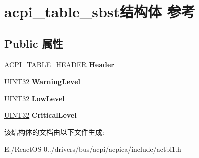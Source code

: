 \hypertarget{structacpi__table__sbst}{}\section{acpi\+\_\+table\+\_\+sbst结构体 参考}
\label{structacpi__table__sbst}
\subsection*{Public 属性}
\begin{DoxyCompactItemize}
\item 
\mbox{\label{structacpi__table__sbst_a5b8a9e8d6767fc12ddb9a6622faebaf8}} 
\hyperlink{structacpi__table__header}{A\+C\+P\+I\+\_\+\+T\+A\+B\+L\+E\+\_\+\+H\+E\+A\+D\+ER} {\bfseries Header}
\item 
\mbox{\label{structacpi__table__sbst_a86ba8882fee0ee899006da5a2548ffba}} 
\hyperlink{_processor_bind_8h_ae1e6edbbc26d6fbc71a90190d0266018}{U\+I\+N\+T32} {\bfseries Warning\+Level}
\item 
\mbox{\label{structacpi__table__sbst_aca6b8b0b2d84737bade5a86af99d3173}} 
\hyperlink{_processor_bind_8h_ae1e6edbbc26d6fbc71a90190d0266018}{U\+I\+N\+T32} {\bfseries Low\+Level}
\item 
\mbox{\label{structacpi__table__sbst_ac80332d1a9a7dcfa588bb426a2f4993e}} 
\hyperlink{_processor_bind_8h_ae1e6edbbc26d6fbc71a90190d0266018}{U\+I\+N\+T32} {\bfseries Critical\+Level}
\end{DoxyCompactItemize}


该结构体的文档由以下文件生成\+:\begin{DoxyCompactItemize}
\item 
E\+:/\+React\+O\+S-\/0../drivers/bus/acpi/acpica/include/actbl1.\+h\end{DoxyCompactItemize}
